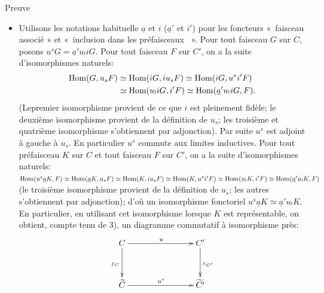 \documentclass[10pt]{../fichiers-configuration-latex/smfart}
\begin{document}
\begin{enonce*}[remark]{Preuve}
\begin{itemize}
\item[i) $\Rightarrow$ iv):] Utilisons les notations habituelle
  $\underline{a}$ et $i$ (\resp $\underline{a}'$ et $i'$) pour les foncteurs
  « faisceau associé » et « inclusion dans les préfaisceaux
  ». Pour tout faisceau $G$ sur $C$, posons $u^sG=\underline{a}'u_{!}i
  G$. Pour tout faisceau $F$ sur $C'$, on a la suite d'isomorphismes
  naturels:
\begin{align*}
\operatorname{Hom}(G,u_sF) &\simeq \operatorname{Hom}(iG, iu_s F)\simeq \operatorname{Hom}(iG, u^\ast i'F)\\
             &\simeq \operatorname{Hom}(u_{!}iG, i'F)\simeq \operatorname{Hom}(\underline{a}'u_{!} iG,
             F){}.
\end{align*}
(Le\pageoriginale premier isomorphisme provient de ce que $i$ est
pleinement fidèle; le deuxième isomorphisme provient de la
définition de $u_s$; les troisième et quatrième isomorphisme
s'obtiennent par adjonction). Par suite $u^s$ est adjoint à gauche à
$u_s$. En particulier $u^s$ commute aux limites inductives. Pour
tout préfaisceau $K$ sur $C$ et tout faisceau $F$ sur $C'$, on a la
suite d'isomorphismes naturels: $\operatorname{Hom}(u^s\underline{a}K,F)\simeq
\operatorname{Hom}(\underline{a}K, u_s F)\simeq \operatorname{Hom}(K,iu_sF)\simeq \operatorname{Hom}(K,u^\ast
i'F)\simeq \operatorname{Hom}(u_{!}K, i'F)\simeq \operatorname{Hom}(\underline{a}'u_{!}K,F)$ (le
troisième isomorphisme provient de la définition de $u_s$; les
autres s'obtiennent par adjonction); d'où un isomorphisme
fonctoriel $u^s\underline{a}K\simeq \underline{a}' u_{!}K$. En particulier,
en utilisant cet isomorphisme lorsque $K$ est représentable, on
obtient, compte tenu de  3), un diagramme commutatif
à isomorphisme près:
\[
\xymatrix@C=2.75cm@R=1.25cm{
C \ar[d]_{\epsilon_C} \ar[r]^{u}& C'\ar[d]^{\epsilon_{C'}}\\
\widetilde{C} \ar[r]^{u^{s}}& \widetilde{C'} }
\]


\end{itemize}
\end{enonce*}
\end{document}
